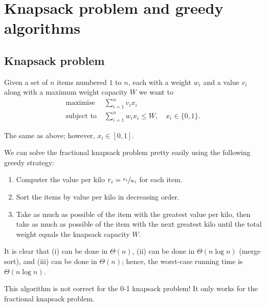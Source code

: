 \chapter{Knapsack problem and greedy algorithms}
\section{Knapsack problem}

\begin{problem}
    Given a set of $n$ items numbered $1$ to $n$, 
    each with a weight $w_i$ and a value $v_i$ along with a maximum weight capacity $W$ we want to
    \begin{align*}
        \text{maximise}\;       & \sum_{i = 1}^n v_i x_i \\
        \text{subject to}\;     & \sum_{i = 1}^n w_i x_i \leq W, \quad x_i \in \{0, 1\}.
    \end{align*}
\end{problem}

\begin{problem}
    The same as above; however, $x_i \in [0, 1]$.
\end{problem}

\begin{example}
    We can solve the fractional knapsack problem pretty easily using the following greedy strategy:
    \begin{enumerate}
        \item Computer the value per kilo $r_i = \sfrac{v_i}{w_i}$ for each item.
        \item Sort the items by value per kilo in decreasing order.
        \item Take as much as possible of the item with the greatest value per kilo, 
            then take as much as possible of the item with the next greatest kilo until the total weight equals the knapsack capacity $W$.
    \end{enumerate}
    It is clear that (i) can be done in $\Theta(n)$, 
    (ii) can be done in $\Theta(n\log{n})$ (merge sort), 
    and (iii) can be done in $\Theta(n)$;
    hence, the worst-case running time is $\Theta{(n\log{n})}$.
\end{example}

\begin{remark}
    This algorithm is not correct for the 0-1 knapsack problem! 
    It only works for the fractional knapsack problem.
\end{remark}

